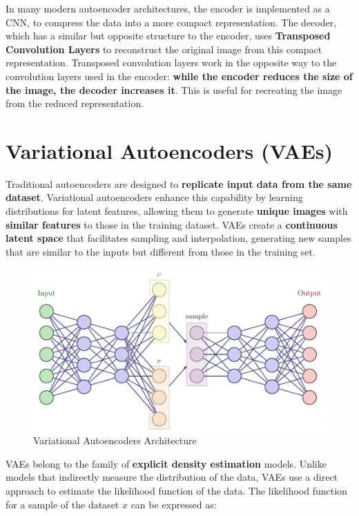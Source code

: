 In many modern autoencoder architectures, the encoder is implemented as a CNN, to compress the data into a more compact representation. The decoder, which has a similar but opposite structure to the encoder, uses \textbf{Transposed Convolution Layers} to reconstruct the original image from this compact representation. Transposed convolution layers work in the opposite way to the convolution layers used in the encoder: \textbf{while the encoder reduces the size of the image, the decoder increases it}. This is useful for recreating the image from the reduced representation.

\section{Variational Autoencoders (VAEs)}

Traditional autoencoders are designed to \textbf{replicate input data from the same dataset}. Variational autoencoders enhance this capability by learning distributions for latent features, allowing them to generate \textbf{unique images} with \textbf{similar features} to those in the training dataset. VAEs create a \textbf{continuous latent space} that facilitates sampling and interpolation, generating new samples that are similar to the inputs but different from those in the training set.

\begin{figure}[!htbp]
    \centering
    \includegraphics[width=\linewidth]{tikz/chapter9 - Variational Autoencoder.pdf}
    \caption{Variational Autoencoders Architecture}
\end{figure}

VAEs belong to the family of \textbf{explicit density estimation} models. Unlike models that indirectly measure the distribution of the data, VAEs use a direct approach to estimate the likelihood function of the data. The likelihood function for a sample of the dataset $x$ can be expressed as:

